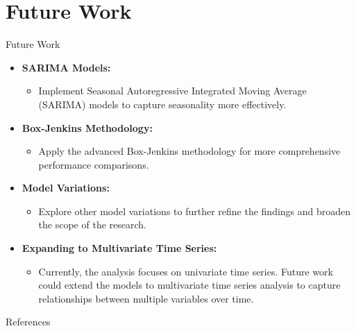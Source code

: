 \documentclass[aspectratio=16 9,10pt]{beamer}
\begin{document}
\section{Future Work}
\begin{frame}{Future Work}
    \begin{itemize}
        \item \textbf{SARIMA Models:}
        \begin{itemize}
            \item Implement Seasonal Autoregressive Integrated Moving Average (SARIMA) models \cite{box2015time} to capture seasonality more effectively.
        \end{itemize}
        
        \item \textbf{Box-Jenkins Methodology:}
        \begin{itemize}
            \item Apply the advanced Box-Jenkins methodology \cite{box2015time} for more comprehensive performance comparisons.
        \end{itemize}
        
        \item \textbf{Model Variations:}
        \begin{itemize}
            \item Explore other model variations to further refine the findings and broaden the scope of the research.
        \end{itemize}

       \item \textbf{Expanding to Multivariate Time Series:}
        \begin{itemize}
            \item Currently, the analysis focuses on univariate time series. Future work could extend the models to multivariate time series analysis to capture relationships between multiple variables over time.
        \end{itemize}
    \end{itemize}
\end{frame}

\begin{frame}[allowframebreaks]{References}
\printbibliography
\end{frame}
\end{document}
